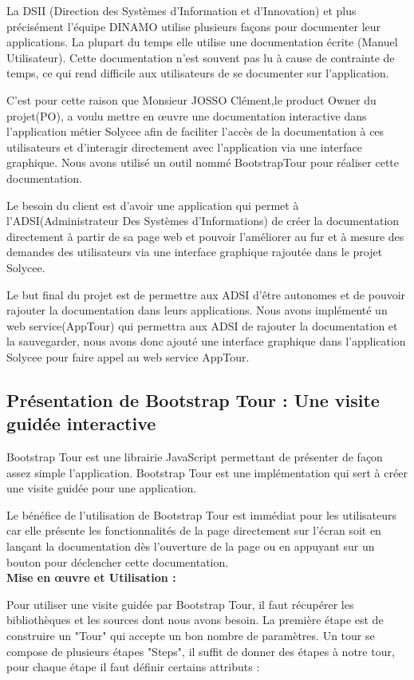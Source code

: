 \documentclass[12pt]{article}
\begin{document}
La DSII (Direction des Systèmes d'Information et d'Innovation) et plus précisément l'équipe DINAMO utilise plusieurs façons pour documenter leur applications. La plupart du temps elle utilise une documentation écrite (Manuel Utilisateur). Cette documentation n'est souvent pas lu à cause de contrainte de temps, ce qui rend difficile aux utilisateurs de se documenter sur l'application.


C'est pour cette raison que Monsieur JOSSO Clément,le product Owner du projet(PO), a voulu mettre en œuvre une documentation interactive dans l'application métier Solycee afin de faciliter l’accès de la documentation à ces utilisateurs et d'interagir directement avec l'application via une interface graphique. Nous avons utilisé un outil nommé BootstrapTour pour réaliser cette documentation. 

Le besoin du client est d'avoir une application qui permet à l'ADSI(Administrateur Des Systèmes d'Informations) de créer la documentation directement à partir de sa page web et pouvoir l'améliorer au fur et à mesure des demandes des utilisateurs via une interface graphique rajoutée dans le projet Solycee. 


Le but final du projet est de permettre aux ADSI d'être autonomes et de pouvoir rajouter la documentation dans leurs applications. Nous avons implémenté un web service(AppTour) qui permettra aux ADSI de rajouter la documentation et la sauvegarder, nous avons donc ajouté une interface graphique dans l'application Solycee pour faire appel au web service AppTour.
 
\subsection{Présentation de Bootstrap Tour : Une visite guidée interactive}
 
Bootstrap Tour est une librairie JavaScript permettant de présenter de façon assez simple l’application. Bootstrap Tour est une implémentation qui sert à créer une visite guidée pour une application.

Le bénéfice de l'utilisation de Bootstrap Tour est immédiat pour les utilisateurs car elle présente les fonctionnalités de la page directement sur l'écran soit en lançant la documentation  dès l'ouverture de la page ou en appuyant sur un bouton pour déclencher cette documentation.\\
\textbf{Mise en œuvre et  Utilisation :}

Pour utiliser une visite guidée par Bootstrap Tour, il faut récupérer les bibliothèques et les sources dont nous avons besoin. La première étape est de construire un "Tour" qui accepte un bon nombre de paramètres. Un tour se compose de plusieurs étapes "Steps", il suffit de donner des étapes à notre tour, pour chaque étape il faut définir certains attributs : 
\end{document}
